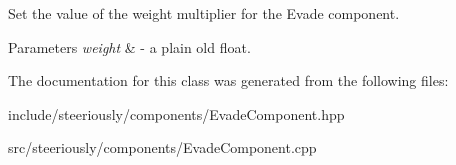 Set the value of the weight multiplier for the Evade component. 


\begin{DoxyParams}{Parameters}
{\em weight} & -\/ a plain old float. \\
\hline
\end{DoxyParams}


The documentation for this class was generated from the following files\-:\begin{DoxyCompactItemize}
\item 
include/steeriously/components/Evade\-Component.\-hpp\item 
src/steeriously/components/Evade\-Component.\-cpp\end{DoxyCompactItemize}
